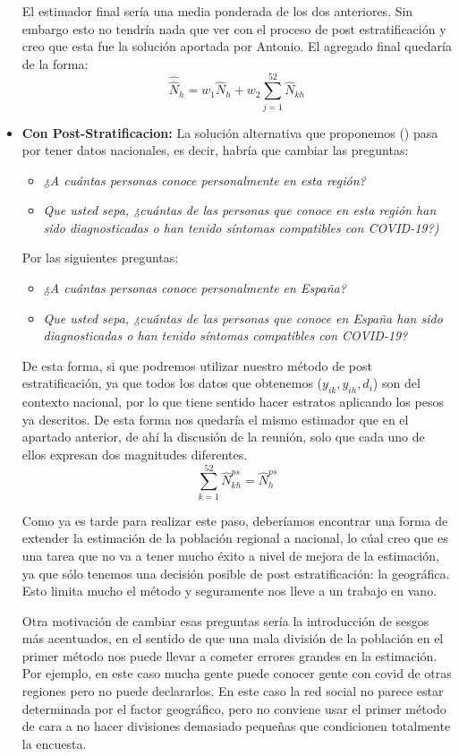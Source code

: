\documentclass{article}
\begin{document}
\begin{itemize}
    El estimador final sería una media ponderada de los dos anteriores. Sin embargo esto no tendría nada que ver con el proceso de post estratificación y creo que esta fue la solución aportada por Antonio.
    El agregado final quedaría de la forma:
    $$\widehat{\widehat{N}}_h = w_1\widehat{N}_h + w_2\sum_{j=1}^{52} \widehat{N}_{kh} $$
    \item \textbf{Con Post-Stratificacion:} La solución alternativa que proponemos (\cite{Poststrat}) pasa por tener datos nacionales, es decir, habría que cambiar las preguntas:
    \begin{itemize}
        \item \textit{¿A cuántas personas conoce personalmente en esta región?}
        \item \textit{Que usted sepa, ¿cuántas de las personas que conoce en esta región han sido diagnosticadas o han tenido síntomas compatibles con COVID-19?)}
    \end{itemize} 
    Por las siguientes preguntas:
    \begin{itemize}
        \item \textit{¿A cuántas personas conoce personalmente en España?}
        \item \textit{Que usted sepa, ¿cuántas de las personas que conoce en España han sido diagnosticadas o han tenido síntomas compatibles con COVID-19?}
    \end{itemize} 
De esta forma, si que podremos utilizar nuestro método de post estratificación, ya que todos los datos que obtenemos ($y_{ik}, y _{ih}, d_i$) son del contexto nacional, por lo que tiene sentido hacer estratos aplicando los pesos ya descritos. De esta forma nos quedaría el mismo estimador que en el apartado anterior, de ahí la discusión de la reunión, solo que cada uno de ellos expresan dos magnitudes diferentes.
   $$\sum_{k=1}^{52} \widehat{N}^{ps}_{kh} = \widehat{N}^{ps}_h$$


Como ya es tarde para realizar este paso, deberíamos encontrar una forma de extender la estimación de la población regional a nacional, lo cúal creo que es una tarea que no va a tener mucho éxito a nivel de mejora de la estimación, ya que sólo tenemos una decisión posible de post estratificación: la geográfica. Esto limita mucho el método y seguramente nos lleve a un trabajo en vano.

Otra motivación de cambiar esas preguntas sería la introducción de sesgos más acentuados, en el sentido de que una mala división de la población en el primer método nos puede llevar a cometer errores grandes en la estimación. Por ejemplo, en este caso mucha gente puede conocer gente con covid de otras regiones pero no puede declararlos. En este caso la red social no parece estar determinada por el factor geográfico, pero no conviene usar el primer método de cara a no hacer divisiones demasiado pequeñas que condicionen totalmente la encuesta.

\end{itemize}
\end{document}
